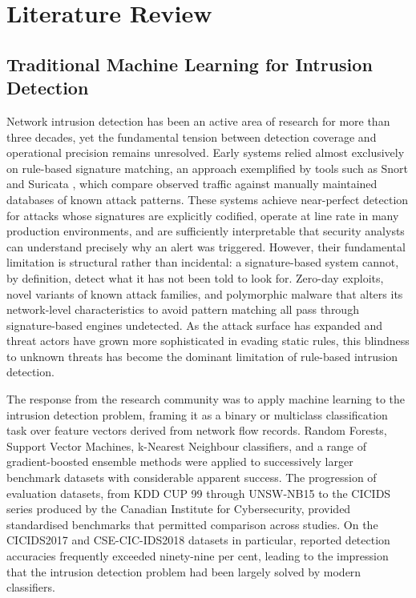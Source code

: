 \chapter{Literature Review}
\label{ch:litreview}

\section{Traditional Machine Learning for Intrusion Detection}
\label{sec:traditional-ml-ids}

Network intrusion detection has been an active area of research for more than three decades, yet the fundamental tension between detection coverage and operational precision remains unresolved. Early systems relied almost exclusively on rule-based signature matching, an approach exemplified by tools such as Snort \autocite{Roesch1999} and Suricata \autocite{OISF2010}, which compare observed traffic against manually maintained databases of known attack patterns. These systems achieve near-perfect detection for attacks whose signatures are explicitly codified, operate at line rate in many production environments, and are sufficiently interpretable that security analysts can understand precisely why an alert was triggered. However, their fundamental limitation is structural rather than incidental: a signature-based system cannot, by definition, detect what it has not been told to look for. Zero-day exploits, novel variants of known attack families, and polymorphic malware that alters its network-level characteristics to avoid pattern matching all pass through signature-based engines undetected. As the attack surface has expanded and threat actors have grown more sophisticated in evading static rules, this blindness to unknown threats has become the dominant limitation of rule-based intrusion detection.

The response from the research community was to apply machine learning to the intrusion detection problem, framing it as a binary or multiclass classification task over feature vectors derived from network flow records. Random Forests, Support Vector Machines, k-Nearest Neighbour classifiers, and a range of gradient-boosted ensemble methods were applied to successively larger benchmark datasets with considerable apparent success. The progression of evaluation datasets, from KDD CUP 99 through UNSW-NB15 to the CICIDS series produced by the Canadian Institute for Cybersecurity, provided standardised benchmarks that permitted comparison across studies. On the CICIDS2017 and CSE-CIC-IDS2018 datasets in particular, reported detection accuracies frequently exceeded ninety-nine per cent, leading to the impression that the intrusion detection problem had been largely solved by modern classifiers.

